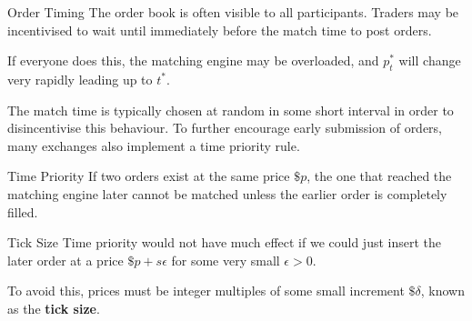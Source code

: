 \documentclass{beamer}
\begin{document}
\begin{frame}{Order Timing}
	The order book is often visible to all participants. Traders may be incentivised to wait until immediately before the match time to post orders.%

	\pause

	If everyone does this, the matching engine may be overloaded, and $p^*_t$ will change very rapidly leading up to $t^*$.

	\pause

	The match time is typically chosen at random in some short interval in order to disincentivise this behaviour.
	\pause
	To further encourage early submission of orders, many exchanges also implement a time priority rule.%
	\begin{block}{Time Priority}
		If two orders exist at the same price $\$p$, the one that reached the matching engine later cannot be matched unless the earlier order is completely filled.
	\end{block}

	\pause

	\begin{block}{Tick Size}
		Time priority would not have much effect if we could just insert the later order at a price $\$p+s\epsilon$ for some very small $\epsilon>0$.%

		To avoid this, prices must be integer multiples of some small increment $\$\delta$, known as the \textbf{tick size}.%
	\end{block}
\end{frame}
\end{document}
